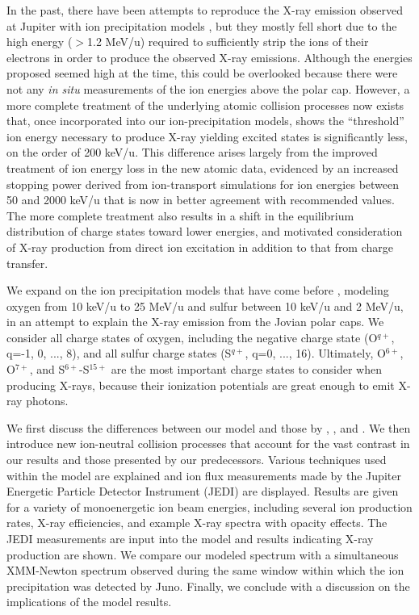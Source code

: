 \documentclass[draft]{agujournal2018}
\begin{document}
In the past, there have been attempts to reproduce the X-ray emission observed at Jupiter with ion precipitation models \citep{cravens1995,ozak2010,ozak2013}, but they mostly fell short due to the high energy ($>$1.2 MeV/u) required to sufficiently strip the ions of their electrons in order to produce the observed X-ray emissions.
Although the energies proposed seemed high at the time, this could be overlooked because there were not any \textit{in situ} measurements of the ion energies above the polar cap.
However, a more complete treatment of the underlying atomic collision processes now exists \citep{gharibnejad2019,schultz2019} that, once incorporated into our ion-precipitation models, shows the ``threshold'' ion energy necessary to produce X-ray yielding excited states is significantly less, on the order of 200 keV/u.
This difference arises largely from the improved treatment of ion energy loss in the new atomic data, evidenced by an increased stopping power derived from ion-transport simulations for ion energies between 50 and 2000 keV/u that is now in better agreement with recommended values.
The more complete treatment also results in a shift in the equilibrium distribution of charge states toward lower energies, and motivated consideration of X-ray production from direct ion excitation in addition to that from charge transfer.

We expand on the ion precipitation models that have come before \citep{cravens1995,houston2018,ozak2010,ozak2013}, modeling oxygen from 10 keV/u to 25 MeV/u and sulfur between 10 keV/u and 2 MeV/u, in an attempt to explain the X-ray emission from the Jovian polar caps.
We consider all charge states of oxygen, including the negative charge state (O$^{q+}$, q=-1, 0, ..., 8), and all sulfur charge states (S$^{q+}$, q=0, ..., 16).
Ultimately, O$^{6+}$, O$^{7+}$, and S$^{6+}$-S$^{15+}$ are the most important charge states to consider when producing X-rays, because their ionization potentials are great enough to emit X-ray photons.

We first discuss the differences between our model and those by \citet{houston2018}, \citet{ozak2010}, and \citet{ozak2013}.
We then introduce new ion-neutral collision processes that account for the vast contrast in our results and those presented by our predecessors.
Various techniques used within the model are explained and ion flux measurements made by the Jupiter Energetic Particle Detector Instrument (JEDI) \citep{mauk2017ssr} are displayed.
Results are given for a variety of monoenergetic ion beam energies, including several ion production rates, X-ray efficiencies, and example X-ray spectra with opacity effects.
The JEDI measurements are input into the model and results indicating X-ray production are shown.
We compare our modeled spectrum with a simultaneous XMM-Newton spectrum observed during the same window within which the ion precipitation was detected by Juno.
Finally, we conclude with a discussion on the implications of the model results.
\end{document}
